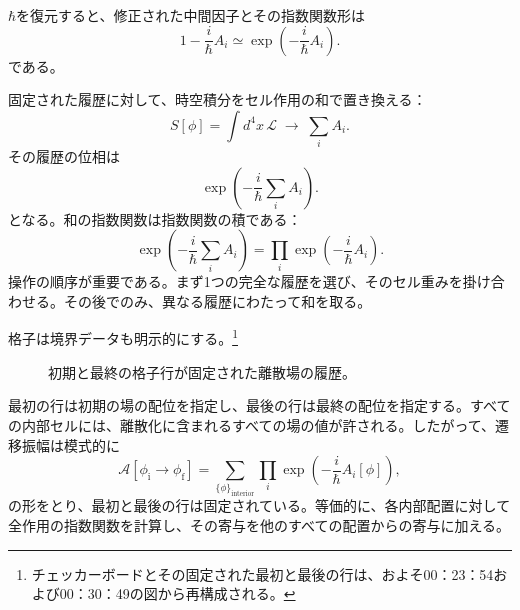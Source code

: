 \(\hbar\)を復元すると、修正された中間因子とその指数関数形は
\begin{equation}
1-\frac{i}{\hbar}A_i
\simeq
\exp\!\left(-\frac{i}{\hbar}A_i\right).
\end{equation}
である。

固定された履歴に対して、時空積分をセル作用の和で置き換える：
\begin{equation}
S[\phi]
=\int d^4x\,\mathcal{L}
\;\longrightarrow\;
\sum_i A_i.
\end{equation}
その履歴の位相は
\begin{equation}
\exp\!\left(-\frac{i}{\hbar}\sum_i A_i\right).
\end{equation}
となる。和の指数関数は指数関数の積である：
\begin{equation}
\exp\!\left(-\frac{i}{\hbar}\sum_i A_i\right)
=
\prod_i\exp\!\left(-\frac{i}{\hbar}A_i\right).
\end{equation}
操作の順序が重要である。まず1つの完全な履歴を選び、そのセル重みを掛け合わせる。その後でのみ、異なる履歴にわたって和を取る。

格子は境界データも明示的にする。\footnote{チェッカーボードとその固定された最初と最後の行は、およそ00：23：54および00：30：49の図から再構成される。}
\begin{figure}[htbp]
\centering
{}
\caption{初期と最終の格子行が固定された離散場の履歴。}
\end{figure}

最初の行は初期の場の配位を指定し、最後の行は最終の配位を指定する。すべての内部セルには、離散化に含まれるすべての場の値が許される。したがって、遷移振幅は模式的に
\begin{equation}
\mathcal{A}\!\left[\phi_{\mathrm{i}}\rightarrow\phi_{\mathrm{f}}\right]
=
\sum_{\{\phi\}_{\mathrm{interior}}}
\prod_i\exp\!\left(-\frac{i}{\hbar}A_i[\phi]\right),
\end{equation}
の形をとり、最初と最後の行は固定されている。等価的に、各内部配置に対して全作用の指数関数を計算し、その寄与を他のすべての配置からの寄与に加える。

